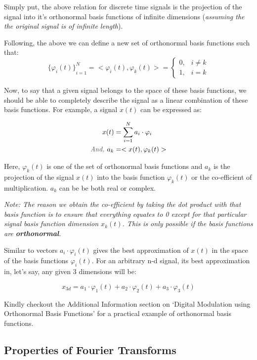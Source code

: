 \documentclass[letterpaper,12pt]{article}
\newcommand{\annot}[1]{\textcolor{darkgray}{\textit{#1}}}
\begin{document}
Simply put, the above relation for discrete time signals is the projection of the signal into it's orthonormal basis functions of infinite dimensions (\textit{assuming the the original signal is of infinite length}).

Following, the above we can define a new set of orthonormal basis functions such that:
\[{\{\varphi_{i}(t)\}}^{N}_{i=1} = <\varphi_{i}(t), \varphi_{k}(t)> = \begin{cases}
        0, & i \neq k \\
        1, & i = k
    \end{cases}
\]

Now, to say that a given signal belongs to the space of these basis functions, we should be able to completely describe the signal as a linear combination of these basis functions. For example, a signal $x(t)$ can be expressed as:

\begin{align*}
    x(t)              & = \sum_{i=1}^{N} a_{i} \cdot \varphi_{i} \\
    \annot{And, } a_k & = <x(t), \varphi_{k}(t)>
\end{align*}

Here, $\varphi_{k}(t)$ is one of the set of orthonormal basis functions and $a_{k}$ is the projection of the signal $x(t)$ into the basis function $\varphi_{k}(t)$ or the co-efficient of multiplication. $a_{k}$ can be be both real or complex.

\textit{Note: The reason we obtain the co-efficient by taking the dot product with that basis function is to ensure that everything equates to 0 except for that particular signal basis function dimension $x_{k}(t)$. This is only possible if the basis functions are \textbf{orthonormal}.}

Similar to vectors $a_{i} \cdot \varphi_{i}(t)$ gives the best approximation of $x(t)$ in the space of the basis functions $\varphi_{i}(t)$. For an arbitrary n-d signal, its best approximation in, let's say, any given 3 dimensions will be:

\[{x}_{3d} = a_{1}\cdot \varphi_{1}(t) + a_{2}\cdot \varphi_{2}(t) + a_{3}\cdot \varphi_{3}(t)\]

Kindly checkout the Additional Information section on `Digital Modulation using Orthonormal Basis Functions' for a practical example of orthonormal basis functions.


\newpage
\subsection*{Properties of Fourier Transforms}
\end{document}
